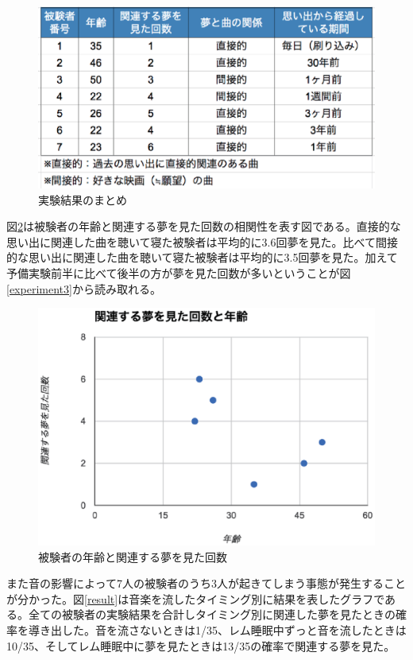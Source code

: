 \begin{figure}[htbp]
\begin{center}
\includegraphics[width=13cm]{eps/categorizedData.eps}
\caption{実験結果のまとめ}
\label{categorizedData}
\end{center}
\end{figure}

図\ref{age}は被験者の年齢と関連する夢を見た回数の相関性を表す図である。直接的な思い出に関連した曲を聴いて寝た被験者は平均的に3.6回夢を見た。比べて間接的な思い出に関連した曲を聴いて寝た被験者は平均的に3.5回夢を見た。加えて予備実験前半に比べて後半の方が夢を見た回数が多いということが図\ref{experiment3}から読み取れる。

\begin{figure}[htbp]
\begin{center}
\includegraphics[width=12cm]{eps/age.eps}
\caption{被験者の年齢と関連する夢を見た回数}
\label{age}
\end{center}
\end{figure}

また音の影響によって7人の被験者のうち3人が起きてしまう事態が発生することが分かった。図\ref{result}は音楽を流したタイミング別に結果を表したグラフである。全ての被験者の実験結果を合計しタイミング別に関連した夢を見たときの確率を導き出した。音を流さないときは1/35、レム睡眠中ずっと音を流したときは10/35、そしてレム睡眠中に夢を見たときは13/35の確率で関連する夢を見た。

